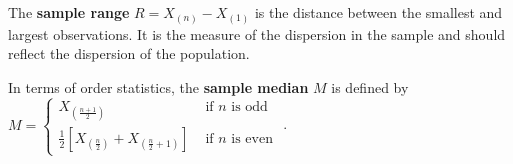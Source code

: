 \begin{defn}
    The \textbf{sample range} $R = X_{(n)} - X_{(1)}$ is the distance between the smallest and largest observations. It is the measure of the dispersion in the sample and should reflect the dispersion of the population.
\end{defn}

\begin{defn}
    In terms of order statistics, the \textbf{sample median} $M$ is defined by \\ 
    $M = \begin{cases} X_{(\frac{n+1}{2})} & \text{ if } n \text{ is odd } \\ \frac{1}{2} \left[ X_{(\frac{n}{2})} + X_{(\frac{n}{2} + 1)}\right] & \text{ if } n \text{ is even } \end{cases}$.
\end{defn}
